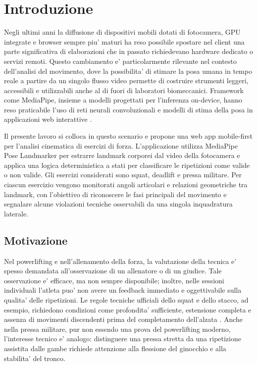 
\chapter{Introduzione}

Negli ultimi anni la diffusione di dispositivi mobili dotati di fotocamera, GPU integrate e browser sempre piu' maturi ha reso possibile spostare nel client una parte significativa di elaborazioni che in passato richiedevano hardware dedicato o servizi remoti. Questo cambiamento e' particolarmente rilevante nel contesto dell'analisi del movimento, dove la possibilita' di stimare la posa umana in tempo reale a partire da un singolo flusso video permette di costruire strumenti leggeri, accessibili e utilizzabili anche al di fuori di laboratori biomeccanici. Framework come MediaPipe, insieme a modelli progettati per l'inferenza on-device, hanno reso praticabile l'uso di reti neurali convoluzionali e modelli di stima della posa in applicazioni web interattive \cite{lugaresi2019mediapipe,bazarevsky2020blazepose,grishchenko2022blazepose,mediapipePoseWeb2026}.

Il presente lavoro si colloca in questo scenario e propone una web app mobile-first per l'analisi cinematica di esercizi di forza. L'applicazione utilizza MediaPipe Pose Landmarker per estrarre landmark corporei dal video della fotocamera e applica una logica deterministica a stati per classificare le ripetizioni come valide o non valide. Gli esercizi considerati sono squat, deadlift e pressa militare. Per ciascun esercizio vengono monitorati angoli articolari e relazioni geometriche tra landmark, con l'obiettivo di riconoscere le fasi principali del movimento e segnalare alcune violazioni tecniche osservabili da una singola inquadratura laterale.

\section{Motivazione}

Nel powerlifting e nell'allenamento della forza, la valutazione della tecnica e' spesso demandata all'osservazione di un allenatore o di un giudice. Tale osservazione e' efficace, ma non sempre disponibile; inoltre, nelle sessioni individuali l'atleta puo' non avere un feedback immediato e oggettivabile sulla qualita' delle ripetizioni. Le regole tecniche ufficiali dello squat e dello stacco, ad esempio, richiedono condizioni come profondita' sufficiente, estensione completa e assenza di movimenti discendenti prima del completamento dell'alzata \cite{ipfRules2024}. Anche nella pressa militare, pur non essendo una prova del powerlifting moderno, l'interesse tecnico e' analogo: distinguere una pressa stretta da una ripetizione assistita dalle gambe richiede attenzione alla flessione del ginocchio e alla stabilita' del tronco.

